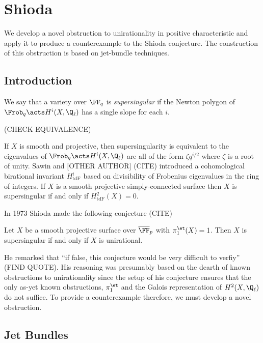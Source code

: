 \documentclass[12pt]{article}
\begin{document}
\section{Shioda}

We develop a novel obstruction to unirationality in positive characteristic and apply it to produce a counterexample to the Shioda conjecture. The construction of this obstruction is based on jet-bundle techniques.

\subsection{Introduction}

We say that a variety over $\FF_q$ is \textit{supersingular} if the Newton polygon of $\Frob_q \acts H^i(X, \Q_\ell)$ has a single slope for each $i$. 

(CHECK EQUIVALENCE)

\newcommand{\tdF}{\mathrm{tdF}}

If $X$ is smooth and projective, then supersingularity is equivalent to the eigenvalues of $\Frob_q \acts H^i(X, \Q_\ell)$ are all of the form $\zeta q^{i/2}$ where $\zeta$ is a root of unity. Sawin and [OTHER AUTHOR] (CITE) introduced a cohomological birational invariant $H^i_{\tdF}$ based on divisibility of Frobenius eigenvalues in the ring of integers. If $X$ is a smooth projective simply-connected surface then $X$ is supersingular if and only if $H^2_{\tdF}(X) = 0$. 

In 1973 Shioda made the following conjecture (CITE)

\begin{conj}[Shioda]
Let $X$ be a smooth projective surface over $\overline{\FF}_p$ with $\pi_1^{\et}(X) = 1$. Then $X$ is supersingular if and only if $X$ is unirational.
\end{conj} 

He remarked that ``if false, this conjecture would be very difficult to verfiy'' (FIND QUOTE). His reasoning was presumably based on the dearth of known obstructions to unirationality since the setup of his conjecture ensures that the only as-yet known obstructions, $\pi_1^{\et}$ and the Galois representation of $H^2(X, \Q_\ell)$ do not suffice. To provide a counterexample therefore, we must develop a novel obstruction.

\subsection{Jet Bundles}
\end{document}

